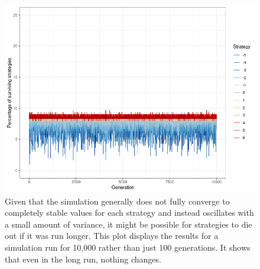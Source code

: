 \documentclass{JASSS}
\begin{document}
\begin{figure}
	\centering
	\includegraphics[width=\linewidth]{./figures/results_default_10000_generations.png}
	\caption{Given that the simulation generally does not fully converge to completely stable values for each strategy and instead oscillates with a small amount of variance, it might be possible for strategies to die out if it was run longer. This plot displays the results for a simulation run for 10,000 rather than just 100 generations. It shows that even in the long run, nothing changes.}
	\label{10000_generations}
\end{figure}
\end{document}
